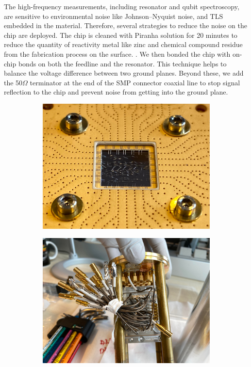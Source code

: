 The high-frequency measurements, including resonator and qubit spectroscopy, are sensitive to environmental noise like Johnson–Nyquist noise, and TLS embedded in the material\cite{RN29}. Therefore, several strategies to reduce the noise on the chip are deployed. The chip is cleaned with Piranha solution for 20 minutes to reduce the quantity of reactivity metal like zinc and chemical compound residue from the fabrication process on the surface. \cite{RN67}. We then bonded the chip with on-chip bonds on both the feedline and the resonator. This technique helps to balance the voltage difference between two ground planes. Beyond these, we add the 50$\Omega$ terminator at the end of the SMP connector coaxial line to stop signal reflection to the chip and prevent noise from getting into the ground plane. 

\begin{figure}[h!]
    \centering
    \begin{subfigure}[b]{0.48\textwidth}
         \centering
         \includegraphics[width=\textwidth]{Pic/Res_postclean.jpg}
         \caption{}
         \label{OnchipBond}
     \end{subfigure}
     \hfill
     \begin{subfigure}[b]{0.48\textwidth}
         \centering
         \includegraphics[width=\textwidth]{Pic/Res_termi.jpg}

\end{subfigure}
\end{figure}
